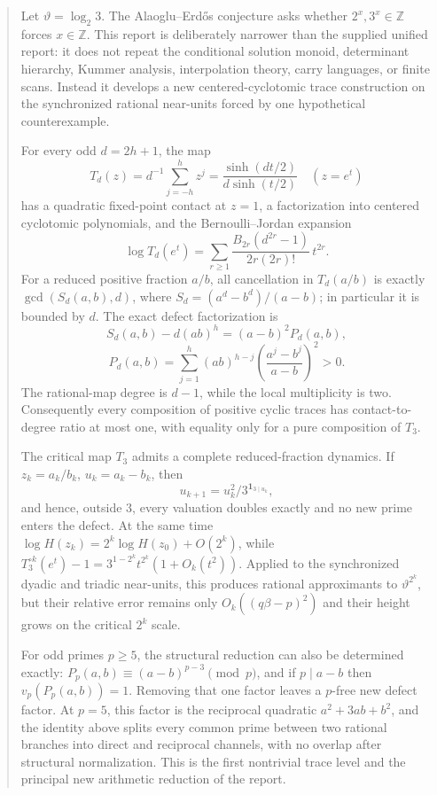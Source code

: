 \documentclass[11pt,oneside]{article}
\theoremstyle{definition}
\theoremstyle{remark}
\newcommand{\Z}{\mathbb Z}
\newcommand{\thetaAE}{\vartheta}
\begin{document}
\begin{abstract}
Let \(\thetaAE=\log_2 3\).  The Alaoglu--Erd\H{o}s conjecture asks whether
\(2^x,3^x\in\Z\) forces \(x\in\Z\).  This report is deliberately narrower than the
supplied unified report: it does not repeat the conditional solution monoid, determinant
hierarchy, Kummer analysis, interpolation theory, carry languages, or finite scans.  Instead
it develops a new centered-cyclotomic trace construction on the synchronized rational
near-units forced by one hypothetical counterexample.

For every odd \(d=2h+1\), the map
\[
 T_d(z)=d^{-1}\sum_{j=-h}^{h}z^j
       =\frac{\sinh(d t/2)}{d\sinh(t/2)}\quad(z=e^t)
\]
has a quadratic fixed-point contact at \(z=1\), a factorization into centered cyclotomic
polynomials, and the Bernoulli--Jordan expansion
\[
 \log T_d(e^t)=\sum_{r\ge1}
 \frac{B_{2r}(d^{2r}-1)}{2r(2r)!}\,t^{2r}.
\]
For a reduced positive fraction \(a/b\), all cancellation in \(T_d(a/b)\) is exactly
\(\gcd(S_d(a,b),d)\), where \(S_d=(a^d-b^d)/(a-b)\); in particular it is bounded by
\(d\).  The exact defect factorization is
\[
 S_d(a,b)-d(ab)^h=(a-b)^2P_d(a,b),
\]
\[
 P_d(a,b)=\sum_{j=1}^{h}(ab)^{h-j}
 \left(\frac{a^j-b^j}{a-b}\right)^2>0.
\]
The rational-map degree is \(d-1\), while the local multiplicity is two.  Consequently every
composition of positive cyclic traces has contact-to-degree ratio at most one, with equality
only for a pure composition of \(T_3\).

The critical map \(T_3\) admits a complete reduced-fraction dynamics.  If
\(z_k=a_k/b_k\), \(u_k=a_k-b_k\), then
\[
 u_{k+1}=u_k^2/3^{\mathbf1_{3\mid u_k}},
\]
and hence, outside \(3\), every valuation doubles exactly and no new prime enters the
defect.  At the same time \(\log H(z_k)=2^k\log H(z_0)+O(2^k)\), while
\(T_3^{\circ k}(e^t)-1=3^{1-2^k}t^{2^k}(1+O_k(t^2))\).  Applied to the synchronized
dyadic and triadic near-units, this produces rational approximants to
\(\thetaAE^{2^k}\), but their relative error remains only \(O_k((q\beta-p)^2)\) and their
height grows on the critical \(2^k\) scale.

For odd primes \(p\ge5\), the structural reduction can also be determined exactly:
\(P_p(a,b)\equiv(a-b)^{p-3}\pmod p\), and if \(p\mid a-b\) then
\(v_p(P_p(a,b))=1\).  Removing that one factor leaves a \(p\)-free new defect factor.
At \(p=5\), this factor is the reciprocal quadratic \(a^2+3ab+b^2\), and the identity above
splits every common prime between two rational branches into direct and reciprocal channels,
with no overlap after structural normalization.  This is the first nontrivial trace level
and the principal new arithmetic reduction of the report.
\end{abstract}
\end{document}

